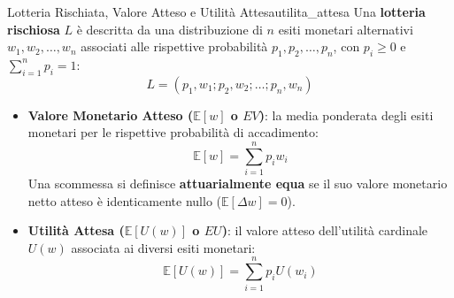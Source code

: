 \begin{definizione}{Lotteria Rischiata, Valore Atteso e Utilità Attesa}{utilita_attesa}
Una \textbf{lotteria rischiosa} $L$ è descritta da una distribuzione di $n$ esiti monetari alternativi $w_1, w_2, \dots, w_n$ associati alle rispettive probabilità $p_1, p_2, \dots, p_n$, con $p_i \ge 0$ e $\sum_{i=1}^n p_i = 1$:
\begin{equation}
    L = (p_1, w_1; p_2, w_2; \dots; p_n, w_n)
\end{equation}
\begin{itemize}
    \item \textbf{Valore Monetario Atteso ($\mathbb{E}[w]$ o $EV$)}: la media ponderata degli esiti monetari per le rispettive probabilità di accadimento:
    \begin{equation}
        \mathbb{E}[w] = \sum_{i=1}^n p_i w_i
    \end{equation}
    Una scommessa si definisce \textbf{attuarialmente equa} se il suo valore monetario netto atteso è identicamente nullo ($\mathbb{E}[\Delta w] = 0$).
    \item \textbf{Utilità Attesa ($\mathbb{E}[U(w)]$ o $EU$)}: il valore atteso dell'utilità cardinale $U(w)$ associata ai diversi esiti monetari:
    \begin{equation}
        \mathbb{E}[U(w)] = \sum_{i=1}^n p_i U(w_i)
    \end{equation}
\end{itemize}
\end{definizione}

